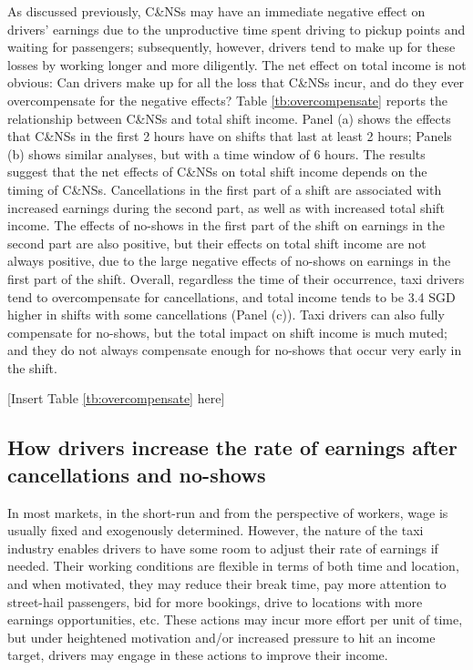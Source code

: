 \documentclass[reviewmode]{restud}
\begin{document}
As discussed previously, C\&NSs may have an immediate negative effect on drivers' earnings due to the unproductive time spent driving to pickup points and waiting for passengers; subsequently, however, drivers tend to make up for these losses by working longer and more diligently. The net effect on total income is not obvious: Can drivers make up for all the loss that C\&NSs incur, and do they ever overcompensate for the negative effects? Table \ref{tb:overcompensate} reports the relationship between C\&NSs and total shift income. Panel (a) shows the effects that C\&NSs in the first 2 hours have on shifts that last at least 2 hours; Panels (b) shows similar analyses, but with a time window of 6 hours. The results suggest that the net effects of C\&NSs on total shift income depends on the timing of C\&NSs. Cancellations in the first part of a shift are associated with increased earnings during the second part, as well as with increased total shift income. The effects of no-shows in the first part of the shift on earnings in the second part are also positive, but their effects on total shift income are not always positive, due to the large negative effects of no-shows on earnings in the first part of the shift. Overall, regardless the time of their occurrence, taxi drivers tend to overcompensate for cancellations, and total income tends to be 3.4 SGD higher in shifts with some cancellations (Panel (c)). Taxi drivers can also fully compensate for no-shows, but the total impact on shift income is much muted; and they do not always compensate enough for no-shows that  occur very early in the shift. 

\begin{center}
	[Insert Table \ref{tb:overcompensate} here]
\end{center}

\subsection{How drivers increase the rate of earnings after cancellations and no-shows}
In most markets, in the short-run and from the perspective of workers, wage is usually fixed and exogenously determined. However, the nature of the taxi industry enables drivers to have some room to adjust their rate of earnings if needed. Their working conditions are flexible in terms of both time and location, and when motivated, they may reduce their break time, pay more attention to street-hail passengers, bid for more bookings, drive to locations with more earnings opportunities, etc. These actions may incur more effort per unit of time, but under heightened motivation and/or increased pressure to hit an income target, drivers may engage in these actions to improve their income.
\end{document}
